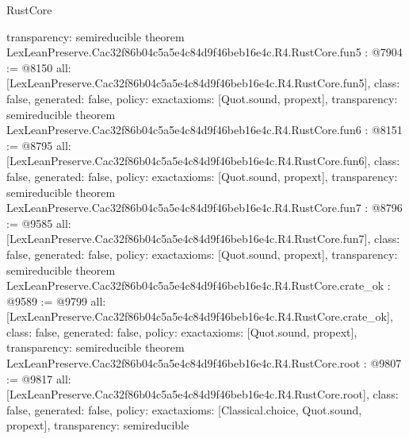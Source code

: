\begin{lexlean}{RustCore}
\begin{coremodule}
{  transparency: semireducible
}
theorem LexLeanPreserve.Cac32f86b04c5a5e4c84d9f46beb16e4c.R4.RustCore.fun5 : @7904 := @8150 {
  all: [LexLeanPreserve.Cac32f86b04c5a5e4c84d9f46beb16e4c.R4.RustCore.fun5],
  class: false,
  generated: false,
  policy: exact{axioms: [Quot.sound, propext]},
  transparency: semireducible
}
theorem LexLeanPreserve.Cac32f86b04c5a5e4c84d9f46beb16e4c.R4.RustCore.fun6 : @8151 := @8795 {
  all: [LexLeanPreserve.Cac32f86b04c5a5e4c84d9f46beb16e4c.R4.RustCore.fun6],
  class: false,
  generated: false,
  policy: exact{axioms: [Quot.sound, propext]},
  transparency: semireducible
}
theorem LexLeanPreserve.Cac32f86b04c5a5e4c84d9f46beb16e4c.R4.RustCore.fun7 : @8796 := @9585 {
  all: [LexLeanPreserve.Cac32f86b04c5a5e4c84d9f46beb16e4c.R4.RustCore.fun7],
  class: false,
  generated: false,
  policy: exact{axioms: [Quot.sound, propext]},
  transparency: semireducible
}
theorem LexLeanPreserve.Cac32f86b04c5a5e4c84d9f46beb16e4c.R4.RustCore.crate_ok : @9589 := @9799 {
  all: [LexLeanPreserve.Cac32f86b04c5a5e4c84d9f46beb16e4c.R4.RustCore.crate_ok],
  class: false,
  generated: false,
  policy: exact{axioms: [Quot.sound, propext]},
  transparency: semireducible
}
theorem LexLeanPreserve.Cac32f86b04c5a5e4c84d9f46beb16e4c.R4.RustCore.root : @9807 := @9817 {
  all: [LexLeanPreserve.Cac32f86b04c5a5e4c84d9f46beb16e4c.R4.RustCore.root],
  class: false,
  generated: false,
  policy: exact{axioms: [Classical.choice, Quot.sound, propext]},
  transparency: semireducible
}


\end{coremodule}
\end{lexlean}
